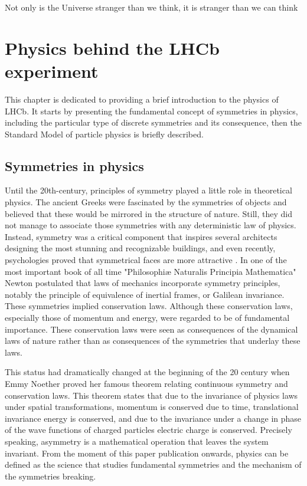 \begin{savequote}[75mm]
Not only is the Universe stranger than we think, it is stranger than we can think
\end{savequote}


\chapter{Physics behind the LHCb experiment }
\label{chapter:physics}
This chapter is dedicated to providing a brief introduction to the physics of LHCb. It starts by presenting the fundamental concept of symmetries in physics, including the particular type of discrete symmetries and its consequence, then the Standard Model of particle physics is briefly described. 

\section{Symmetries in physics}
Until the 20th-century, principles of symmetry played a little role in theoretical physics. The ancient Greeks were fascinated by the symmetries of objects and believed that these would be mirrored in the structure of nature. Still, they did not manage to associate those symmetries with any deterministic law of physics. Instead, symmetry was a critical component that inspires several architects designing the most stunning and recognizable buildings, and even recently, psychologies proved that symmetrical faces are more attractive \cite{faces}. 
In one of the most important book of all time "Philosophiæ Naturalis Principia Mathematica" \cite{newton} 
Newton postulated that laws of mechanics incorporate symmetry principles, notably the principle of equivalence of inertial frames, or Galilean invariance. These symmetries implied conservation laws. Although these conservation laws, especially those of momentum and energy, were regarded to be of fundamental importance. These conservation laws were seen as consequences of the dynamical laws of nature rather than as consequences of the symmetries that underlay these laws.  

This status had dramatically changed at the beginning of the 20 century when Emmy Noether proved her famous theorem relating continuous symmetry and conservation laws.
This theorem states that due to the invariance of physics laws under spatial transformations, momentum is conserved due to time, translational invariance energy is conserved, and due to the invariance under a change in phase of the wave functions of charged particles electric charge is conserved. Precisely speaking, asymmetry is a mathematical operation that leaves the system invariant. 
From the moment of this paper publication onwards, physics can be defined as the science that studies fundamental symmetries and the mechanism of the symmetries breaking.  

